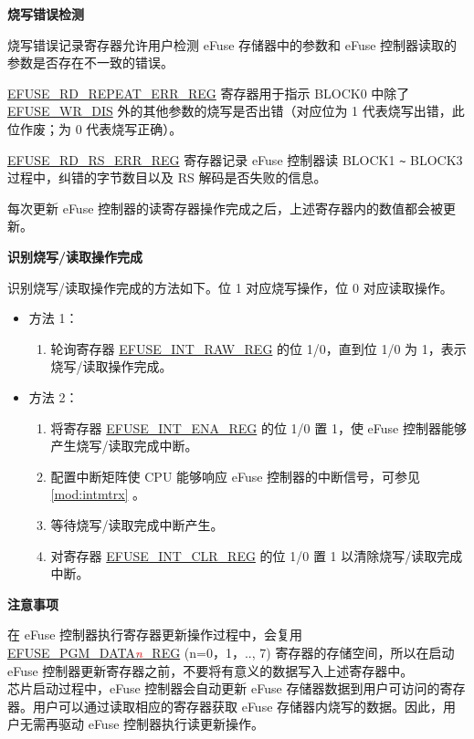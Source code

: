 \documentclass[main\_\_CN.tex]{subfiles}
\begin{document}
{\bfseries 烧写错误检测}

烧写错误记录寄存器允许用户检测 eFuse 存储器中的参数和 eFuse 控制器读取的参数是否存在不一致的错误。

\hyperref[regdesc:EFUSERDREPEATERRREG]{EFUSE\_RD\_REPEAT\_ERR\_REG} 寄存器用于指示 BLOCK0 中除了 \hyperref[fielddesc:EFUSEWRDIS]{EFUSE\_WR\_DIS} 外的其他参数的烧写是否出错（对应位为 1 代表烧写出错，此位作废；为 0 代表烧写正确）。

\hyperref[regdesc:EFUSERDRSERRREG]{EFUSE\_RD\_RS\_ERR\_REG} 寄存器记录 eFuse 控制器读 BLOCK1 \verb+~+ BLOCK3 过程中，纠错的字节数目以及 RS 解码是否失败的信息。

每次更新 eFuse 控制器的读寄存器操作完成之后，上述寄存器内的数值都会被更新。

{\bfseries 识别烧写/读取操作完成}

识别烧写/读取操作完成的方法如下。位 1 对应烧写操作，位 0 对应读取操作。
\begin{itemize}

    \item 方法 1：
        \begin{enumerate}
            \item 轮询寄存器 \hyperref[regdesc:EFUSEINTRAWREG]{EFUSE\_INT\_RAW\_REG} 的位 1/0，直到位 1/0 为 1，表示烧写/读取操作完成。
        \end{enumerate}
    \item 方法 2：
        \begin{enumerate}
            \item 将寄存器 \hyperref[regdesc:EFUSEINTENAREG]{EFUSE\_INT\_ENA\_REG} 的位 1/0 置 1，使 eFuse 控制器能够产生烧写/读取完成中断。
            \item 配置中断矩阵使 CPU 能够响应 eFuse 控制器的中断信号，可参见 \ref{mod:intmtrx} \textit{}。

            \item 等待烧写/读取完成中断产生。

            \item 对寄存器 \hyperref[regdesc:EFUSEINTCLRREG]{EFUSE\_INT\_CLR\_REG} 的位 1/0 置 1 以清除烧写/读取完成中断。
    \end{enumerate}
\end{itemize}

{\bfseries 注意事项}

在 eFuse 控制器执行寄存器更新操作过程中，会复用 \hyperref[regdesc:EFUSEPGMDATA0REG]{EFUSE\_PGM\_DATA\textcolor{red}{\it{n}}\_REG} (n=0，1，.., 7) 寄存器的存储空间，所以在启动 eFuse 控制器更新寄存器之前，不要将有意义的数据写入上述寄存器中。\\
芯片启动过程中，eFuse 控制器会自动更新 eFuse 存储器数据到用户可访问的寄存器。用户可以通过读取相应的寄存器获取 eFuse 存储器内烧写的数据。因此，用户无需再驱动 eFuse 控制器执行读更新操作。
\end{document}
